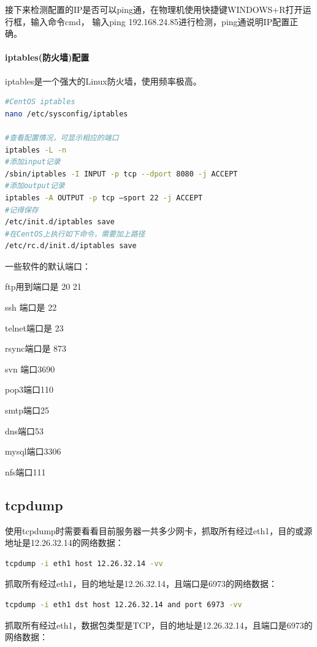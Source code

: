 \documentclass{book}
\begin{document}
接下来检测配置的IP是否可以ping通，在物理机使用快捷键WINDOWS+R打开运行框，输入命令cmd，
输入ping 192.168.24.85进行检测，ping通说明IP配置正确。

\paragraph{iptables(防火墙)配置}iptables是一个强大的Linux防火墙，使用频率极高。

\begin{lstlisting}[language=Bash]
#CentOS iptables
nano /etc/sysconfig/iptables

#查看配置情况，可显示相应的端口
iptables -L -n
#添加input记录
/sbin/iptables -I INPUT -p tcp --dport 8080 -j ACCEPT
#添加output记录
iptables -A OUTPUT -p tcp –sport 22 -j ACCEPT
#记得保存
/etc/init.d/iptables save
#在CentOS上执行如下命令，需要加上路径
/etc/rc.d/init.d/iptables save
\end{lstlisting}


一些软件的默认端口：

ftp用到端口是 20 21

ssh 端口是 22

telnet端口是 23

rsync端口是 873

svn 端口3690

pop3端口110

smtp端口25

dns端口53

mysql端口3306

nfs端口111

\subsection{tcpdump}

使用tcpdump时需要看看目前服务器一共多少网卡，抓取所有经过eth1，目的或源地址是12.26.32.14的网络数据：

\begin{lstlisting}[language=Bash]
tcpdump -i eth1 host 12.26.32.14 -vv
\end{lstlisting}

抓取所有经过eth1，目的地址是12.26.32.14，且端口是6973的网络数据：

\begin{lstlisting}[language=Bash]
tcpdump -i eth1 dst host 12.26.32.14 and port 6973 -vv
\end{lstlisting}

抓取所有经过eth1，数据包类型是TCP，目的地址是12.26.32.14，且端口是6973的网络数据：
\end{document}
